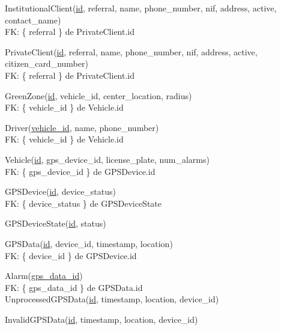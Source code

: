 \documentclass[parskip=full]{scrreprt}
\author{André Páscoa A48089}
\date{03/04/2022}
\begin{document}

    InstitutionalClient(\underline{id}, referral, name, phone\_number, nif, address, active, contact\_name)\\
    FK: \{ referral \} de PrivateClient.id

    PrivateClient(\underline{id}, referral, name, phone\_number, nif,
    address, active, citizen\_card\_number)\\
    FK: \{ referral \} de PrivateClient.id

    GreenZone(\underline{id}, vehicle\_id, center\_location, radius)\\
    FK: \{ vehicle\_id \} de Vehicle.id

    Driver(\underline{vehicle\_id}, name, phone\_number)\\
    FK: \{ vehicle\_id \} de Vehicle.id

    Vehicle(\underline{id}, gps\_device\_id, license\_plate, num\_alarms)\\
    FK: \{ gps\_device\_id \} de GPSDevice.id

    GPSDevice(\underline{id}, device\_status)\\
    FK: \{ device\_status \} de GPSDeviceState

    GPSDeviceState(\underline{id}, status)

    GPSData(\underline{id}, device\_id, timestamp, location)\\
    FK: \{ device\_id \} de GPSDevice.id

    Alarm(\underline{gps\_data\_id})\\
    FK: \{ gps\_data\_id \} de GPSData.id\\

    UnprocessedGPSData(\underline{id}, timestamp, location, device\_id)

    InvalidGPSData(\underline{id}, timestamp, location, device\_id)
\end{document}
